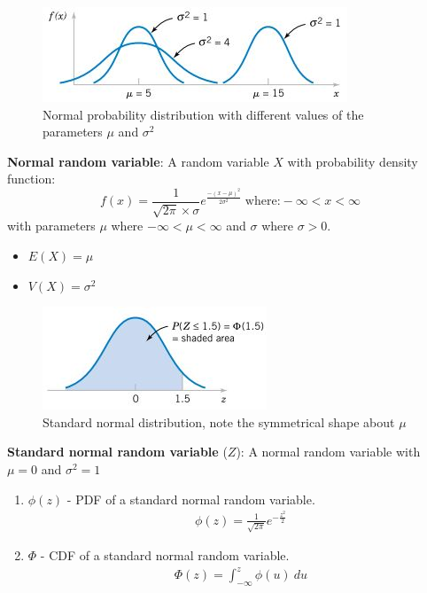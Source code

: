 \documentclass[10pt,a4paper]{article}
\begin{document}
\begin{figure} [h!]
    \centering
    \includegraphics[]{Normalintro.JPG}
    \caption{Normal probability distribution with different values of the parameters $\mu$ and $\sigma^2$}
\end{figure}

\textbf{Normal random variable}: A random variable $X$ with probability density function:
$$
    f(x) = \frac{1}{\sqrt{2\pi}\times \sigma} e^{\frac{-(x-\mu)^2}{2\sigma^2}} \; \text{where:} -\infty < x < \infty
$$
with parameters $\mu$ where $-\infty < \mu < \infty$ and $\sigma$ where $\sigma > 0$.
\begin{itemize}
    \item $E(X) = \mu$ 
    \item $V(X) = \sigma^2$
\end{itemize}

\begin{figure} [h!]
    \centering
    \includegraphics[]{standardnormal.JPG}
    \caption{Standard normal distribution, note the symmetrical shape about $\mu$}
\end{figure}

\begin{tcolorbox}[breakable,colback=white]
    \textbf{Standard normal random variable} ($Z$): A normal random variable with $\mu=0$ and $\sigma^2
    = 1$
    \begin{enumerate}
        \item $\phi(z)$ - PDF of a standard normal random variable.  
        \begin{align*}
            \phi(z) = \frac{1}{\sqrt{2\pi}}e^{-\frac{z^2}{2}}
        \end{align*}
        \item $\Phi$ - CDF of a standard normal random variable.
        \begin{align*}
            \Phi(z) = \int_{-\infty}^z \phi(u)\: du
        \end{align*}
    \end{enumerate}
\end{tcolorbox}
\end{document}
